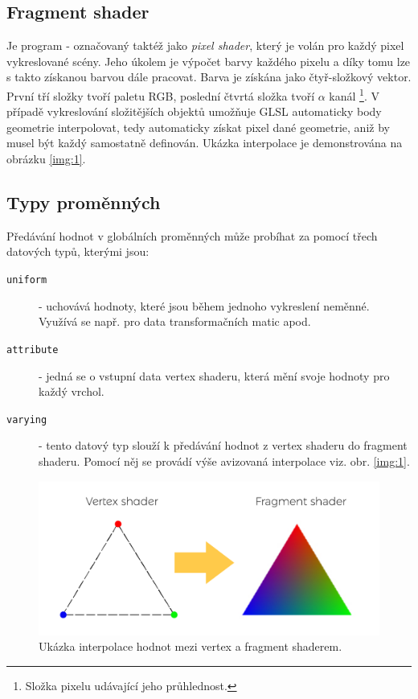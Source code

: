 \subsection{Fragment shader}
Je program - označovaný taktéž jako \textit{pixel shader}, který je volán pro každý pixel vykreslované scény. Jeho úkolem je výpočet barvy každého pixelu a díky tomu lze s takto získanou barvou  dále pracovat. Barva je získána jako čtyř-složkový vektor. První tří složky tvoří paletu RGB, poslední čtvrtá složka tvoří $\alpha$ kanál \footnote{Složka pixelu udávající jeho průhlednost.}. V případě vykreslování složitějších objektů umožňuje GLSL automaticky body geometrie interpolovat, tedy automaticky získat pixel dané geometrie, aniž by musel být každý samostatně definován. Ukázka interpolace je demonstrována na obrázku \ref{img:1}.

\newpage


\subsection{Typy proměnných}
Předávání hodnot v globálních proměnných může probíhat za pomocí třech datových typů, kterými jsou:
\begin{description}
	\item[\texttt{uniform}]  
	- uchovává hodnoty, které jsou během jednoho vykreslení neměnné. Využívá se např. pro data transformačních matic apod.	
	
	\item[\texttt{attribute}] 
	- 	jedná se o vstupní data vertex shaderu, která mění svoje hodnoty pro každý vrchol. 
	
	\item[\texttt{varying}] 
	- tento datový typ slouží k předávání hodnot z vertex shaderu do fragment shaderu. Pomocí něj se provádí výše avizovaná interpolace viz. obr. \ref{img:1}.

\end{description}


 
\begin{figure}[h]
	\label{img:1}
	\centering
	\includegraphics[scale=1.0,angle=0,width=1.0\linewidth]{obrazky-figures/interpolace}
	\caption{Ukázka interpolace hodnot mezi vertex a fragment shaderem.}
	\label{fig:inter}
\end{figure}
 



